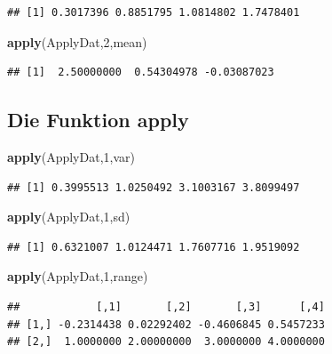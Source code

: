 \documentclass[]{article}
\newenvironment{Shaded}{\begin{snugshade}}{\end{snugshade}}
\newcommand{\KeywordTok}[1]{\textcolor[rgb]{0.13,0.29,0.53}{\textbf{{#1}}}}
\newcommand{\DecValTok}[1]{\textcolor[rgb]{0.00,0.00,0.81}{{#1}}}
\newcommand{\NormalTok}[1]{{#1}}
\begin{document}
\begin{verbatim}
## [1] 0.3017396 0.8851795 1.0814802 1.7478401
\end{verbatim}

\begin{Shaded}
\begin{Highlighting}[]
\KeywordTok{apply}\NormalTok{(ApplyDat,}\DecValTok{2}\NormalTok{,mean)}
\end{Highlighting}
\end{Shaded}

\begin{verbatim}
## [1]  2.50000000  0.54304978 -0.03087023
\end{verbatim}

\subsection{Die Funktion apply}\label{die-funktion-apply}

\begin{Shaded}
\begin{Highlighting}[]
\KeywordTok{apply}\NormalTok{(ApplyDat,}\DecValTok{1}\NormalTok{,var)}
\end{Highlighting}
\end{Shaded}

\begin{verbatim}
## [1] 0.3995513 1.0250492 3.1003167 3.8099497
\end{verbatim}

\begin{Shaded}
\begin{Highlighting}[]
\KeywordTok{apply}\NormalTok{(ApplyDat,}\DecValTok{1}\NormalTok{,sd)}
\end{Highlighting}
\end{Shaded}

\begin{verbatim}
## [1] 0.6321007 1.0124471 1.7607716 1.9519092
\end{verbatim}

\begin{Shaded}
\begin{Highlighting}[]
\KeywordTok{apply}\NormalTok{(ApplyDat,}\DecValTok{1}\NormalTok{,range)}
\end{Highlighting}
\end{Shaded}

\begin{verbatim}
##            [,1]       [,2]       [,3]      [,4]
## [1,] -0.2314438 0.02292402 -0.4606845 0.5457233
## [2,]  1.0000000 2.00000000  3.0000000 4.0000000
\end{verbatim}
\end{document}
